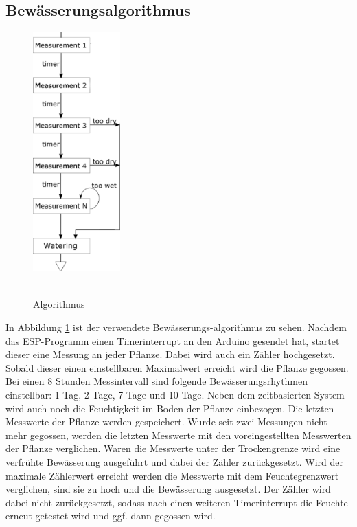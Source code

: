 \subsection{Bewässerungsalgorithmus}
\begin{figure}
    \caption{\\Algorithmus}
    \includegraphics[width=0.3\textwidth]{marcel/algo}
    \label{arduinoalgo}
\end{figure}
In Abbildung \ref{arduinoalgo} ist der verwendete Bewässerungs-algorithmus zu sehen.
Nachdem das ESP-Programm einen Timerinterrupt an den Arduino gesendet hat,
startet dieser eine Messung an jeder Pflanze. Dabei wird auch ein Zähler
hochgesetzt. Sobald dieser einen einstellbaren Maximalwert erreicht wird
die Pflanze gegossen. Bei einen 8 Stunden Messintervall sind folgende
Bewässerungsrhythmen einstellbar: 1 Tag, 2 Tage, 7 Tage und 10 Tage.
Neben dem zeitbasierten System wird auch noch die Feuchtigkeit im Boden
der Pflanze einbezogen. Die letzten Messwerte der Pflanze werden gespeichert.
Wurde seit zwei Messungen nicht mehr gegossen, werden die letzten Messwerte
mit den voreingestellten Messwerten der Pflanze verglichen. Waren die
Messwerte unter der Trockengrenze wird eine verfrühte Bewässerung ausgeführt
und dabei der Zähler zurückgesetzt. Wird der maximale Zählerwert erreicht
werden die Messwerte mit dem Feuchtegrenzwert verglichen, sind sie zu hoch
und die Bewässerung ausgesetzt. Der Zähler wird dabei nicht zurückgesetzt,
sodass nach einen weiteren Timerinterrupt die Feuchte erneut getestet wird
und ggf. dann gegossen wird.

